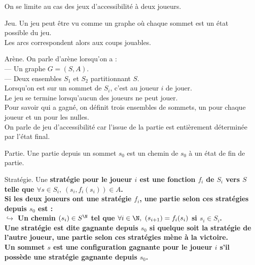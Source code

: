 \documentclass[french, 11pt]{article}
\begin{document}


On se limite au cas des jeux d'accessibilité à deux joueurs.

\begin{defi}{Jeu.}{}
    Un jeu peut être vu comme un graphe où chaque sommet est un état possible du jeu.\\
    Les arcs correspondent alors aux coups jouables.
\end{defi}

\vspace*{-0.3cm}

\begin{defi}{Arène.}{}
    On parle d'arène lorsqu'on a :\\
    --- Un graphe $G=(S,A)$.\\
    --- Deux ensembles $S_1$ et $S_2$ partitionnant $S$.\\
    Lorsqu'on est sur un sommet de $S_i$, c'est au joueur $i$ de jouer.\\
    Le jeu se termine lorsqu'aucun des joueurs ne peut jouer.\\
    Pour savoir qui a gagné, on définit trois ensembles de sommets, un pour chaque joueur et un pour les nulles.\\
    On parle de jeu d'accessibilité car l'issue de la partie est entièrement déterminée par l'état final.
\end{defi}

\vspace*{-0.3cm}

\begin{defi}{Partie.}{}
    Une partie depuis un sommet $s_0$ est un chemin de $s_0$ à un état de fin de partie.
\end{defi}

\vspace*{-0.3cm}

\begin{defi}{Stratégie.}{}
    Une \bf{stratégie} pour le joueur $i$ est une fonction $f_i$ de $S_i$ vers $S$ telle que $\forall s \in S_i, ~ (s_i, f_i(s_i))\in A$.\\
    Si les deux joueurs ont une stratégie $f_i$, une partie selon ces stratégies depuis $s_0$ est :\\
    $\hookrightarrow$ Un chemin $(s_i)\in S^\N$ tel que $\forall i \in \N, ~ (s_{i+1}) = f_i(s_i)$ si $s_i \in S_i$.\\
    Une stratégie est dite \bf{gagnante} depuis $s_0$ si quelque soit la stratégie de l'autre joueur, une partie selon ces stratégies mène à la victoire.\\
    Un sommet $s$ est une configuration gagnante pour le joueur $i$ s'il possède une stratégie gagnante depuis $s_0$.
\end{defi}
\end{document}
